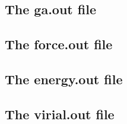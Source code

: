 \documentclass[12pt,a4paper]{report}
\begin{document}
\subsection{The ga.out file}

\subsection{The force.out file}

\subsection{The energy.out file}

\subsection{The virial.out file}




\end{document}
